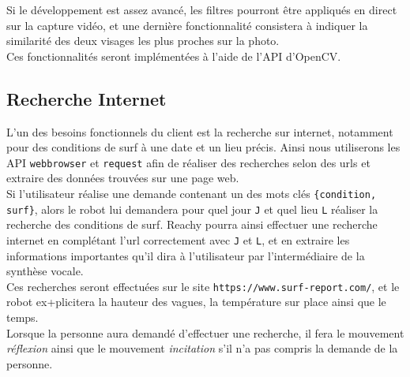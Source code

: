 Si le développement est assez avancé, les filtres pourront être appliqués en direct sur la capture vidéo, et une dernière fonctionnalité consistera à indiquer la similarité des deux visages les plus proches sur la photo. \\
Ces fonctionnalités seront implémentées à l'aide de l'API d'OpenCV.

\subsection{Recherche Internet}
L'un des besoins fonctionnels du client est la recherche sur internet, notamment pour des conditions de surf à une date et un lieu précis. Ainsi nous utiliserons les API \texttt{webbrowser} et \texttt{request} afin de réaliser des recherches selon des urls et extraire des données trouvées sur une page web. \\

Si l'utilisateur réalise une demande contenant un des mots clés \texttt{\{condition, surf\}}, alors le robot lui demandera pour quel jour \texttt{J} et quel lieu \texttt{L} réaliser la recherche des conditions de surf.
Reachy pourra ainsi effectuer une recherche internet en complétant l'url correctement avec \texttt{J} et \texttt{L}, et en extraire les informations importantes qu'il dira à l'utilisateur par l'intermédiaire de la synthèse vocale. \\

Ces recherches seront effectuées sur le site \texttt{https://www.surf-report.com/}, et le robot ex+plicitera la hauteur des vagues, la température sur place ainsi que le temps. \\

Lorsque la personne aura demandé d'effectuer une recherche, il fera le mouvement \textit{réflexion} ainsi que le mouvement \textit{incitation} s'il n'a pas compris la demande de la personne.

